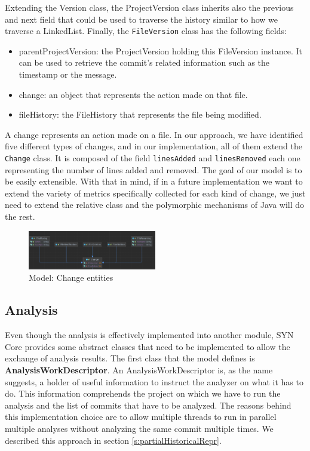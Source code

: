 Extending the Version class, the ProjectVersion class inherits also the previous and next field that could be used to traverse the history similar to how we traverse a LinkedList. 
Finally, the \texttt{FileVersion} class has the following fields:
\begin{itemize}
    \item parentProjectVersion: the ProjectVersion holding this FileVersion instance. It can be used to retrieve the commit's related information such as the timestamp or the message. 
    \item change: an object that represents the action made on that file. 
    \item fileHistory: the FileHistory that represents the file being modified. 
\end{itemize}

A change represents an action made on a file. In our approach, we have identified five different types of changes, and in our implementation, all of them extend the \texttt{Change} class. It is composed of the field \texttt{linesAdded} and \texttt{linesRemoved} each one representing the number of lines added and removed. 
The goal of our model is to be easily extensible. With that in mind, if in a future implementation we want to extend the variety of metrics specifically collected for each kind of change, we just need to extend the relative class and the polymorphic mechanisms of Java will do the rest. 

\begin{figure}
    \center
    \includegraphics[width=0.5\textwidth]{UMLChanges.png}
    \caption{Model: Change entities}
    \label{fig:modelChange}
\end{figure}


\subsection*{Analysis}
Even though the analysis is effectively implemented into another module, SYN Core provides some abstract classes that need to be implemented to allow the exchange of analysis results. 
The first class that the model defines is \textbf{AnalysisWorkDescriptor}.
An AnalysisWorkDescriptor is, as the name suggests, a holder of useful information to instruct the analyzer on what it has to do. This information comprehends the project on which we have to run the analysis and the list of commits that have to be analyzed. 
The reasons behind this implementation choice are to allow multiple threads to run in parallel multiple analyses without analyzing the same commit multiple times. 
We described this approach in section \ref{s:partialHistoricalRepr}.
\bigbreak

